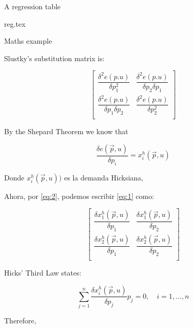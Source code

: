 \documentclass[utf8, twoside,]{article}
\begin{document}
\begin{otherlanguage}{american}
A regression table

 \begin{table}[ht]
 {reg.tex}
 \caption{Table imported from Stata} \label{table:reg1}
\end{table}


Maths example 

Slustky's substitution matrix is:
 
 \begin{equation}\label{eq:1}
    \begin{bmatrix}
 \dfrac{\delta^2e(p.u)}{\delta p_1^2} & \dfrac{\delta^2e(p.u)}{\delta p_2 \delta p_1} \\[2ex]
 \dfrac{\delta^2e(p.u)}{\delta p_1\delta p_2} & \dfrac{\delta^2e(p.u)}{\delta p_2^2} \\[2ex]
 \end{bmatrix}
\end{equation}
 

By the Shepard Theorem we know that
  
   \begin{equation}\label{eq:2}
   \dfrac{\delta e (\vec{p}, u)}{\delta p_i} = x_i^h(\vec{p}, u)
   \end{equation}
   
   Donde $x_i^h(\vec{p}, u))$ es la demanda Hicksiana,
  
   Ahora, por \eqref{eq:2}, podemos escribir \eqref{eq:1} como:
   
    \begin{equation}
    \begin{bmatrix}
 \dfrac{\delta x_1^h(\vec{p}, u)}{\delta p_1} 
 & \dfrac{\delta x_1^h(\vec{p}, u)}{\delta p_2} \\[2ex]
 \dfrac{\delta x_2^h(\vec{p}, u)}{\delta p_1} 
 & \dfrac{\delta x_2^h(\vec{p}, u)}{\delta p_2} \\[2ex]
 \end{bmatrix}
\end{equation}
  
Hicks' Third Law states:

   \begin{equation*}
      \sum_{j=1}^n \dfrac{\delta x_i^h(\vec{p}, u)}{\delta p_j} p_j = 0, \quad i=1,\dots,n
  \end{equation*}
  
Therefore,
  

\end{otherlanguage}
\end{document}
